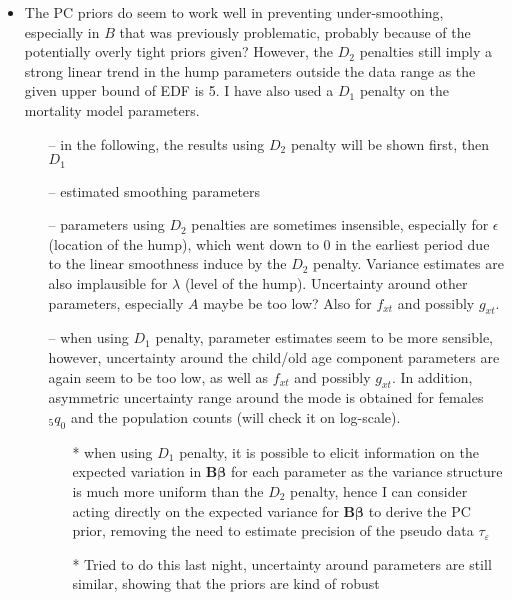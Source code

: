 \documentclass[12pt,a4paper]{article}
\begin{document}
\begin{itemize}
	\item The PC priors do seem to work well in preventing under-smoothing, especially in $B$ that was previously problematic, probably because of the potentially overly tight priors given? However, the $D_2$ penalties still imply a strong linear trend in the hump parameters outside the data range as the given upper bound of EDF is 5. I have also used a $D_1$ penalty on the mortality model parameters.
	\begin{itemize}
	\item[--] in the following, the results using $D_2$ penalty will be shown first, then $D_1$
	\item[--] estimated smoothing parameters 
	\item[--] parameters using $D_2$ penalties are sometimes insensible, especially for $\epsilon$ (location of the hump), which went down to 0 in the earliest period due to the linear smoothness induce by the $D_2$ penalty. Variance estimates are also implausible for $\lambda$ (level of the hump). Uncertainty around other parameters, especially $A$ maybe be too low? Also for $f_{xt}$ and possibly $g_{xt}$.
	\item[--] when using $D_1$ penalty, parameter estimates seem to be more sensible, however, uncertainty around the child/old age component parameters are again seem to be too low, as well as $f_{xt}$ and possibly $g_{xt}$. In addition, asymmetric uncertainty range around the mode is obtained for females $_5q_0$ and the population counts (will check it on log-scale).
	\begin{itemize}
	\item[*] when using $D_1$ penalty, it is possible to elicit information on the expected variation in $\boldsymbol{B\beta}$ for each parameter as the variance structure is much more uniform than the $D_2$ penalty, hence I can consider acting directly on the expected variance for $\boldsymbol{B\beta}$ to derive the PC prior, removing the need to estimate precision of the pseudo data $\tau_{\varepsilon}$
	\item[*] Tried to do this last night, uncertainty around parameters are still similar, showing that the priors are kind of robust
	\end{itemize}
	\end{itemize}
\end{itemize}




\end{document}
